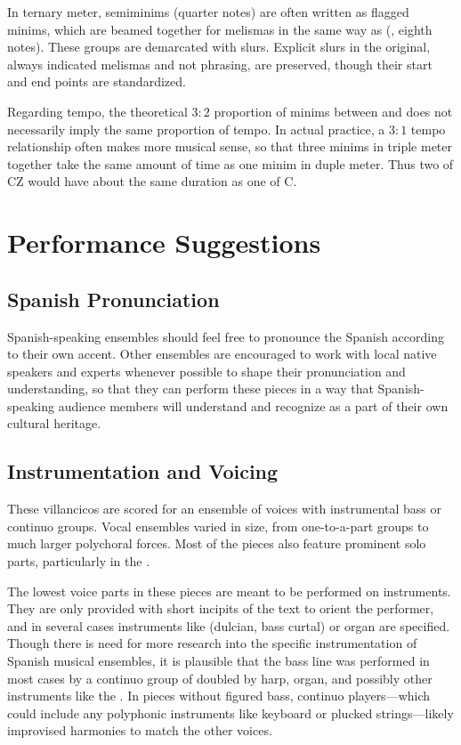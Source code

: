 In ternary meter, semiminims (quarter notes) are often written as flagged
minims, which are beamed together for melismas in the same way as
 (, eighth notes).
These groups are demarcated with slurs.
Explicit slurs in the original, always indicated melismas and not phrasing,
are preserved, though their start and end points are standardized.

Regarding tempo, the theoretical $3:2$ proportion of minims between
\meterCThreeTwo{} and \meterC{} does not necessarily imply the same proportion of
tempo.  
In actual practice, a $3:1$ tempo relationship often makes more musical sense,
so that three minims in triple meter together take the same amount of time as
one minim in duple meter.
Thus two  of CZ would have about the same duration as one 
 of C.

\section{Performance Suggestions}

\subsection{Spanish Pronunciation}
Spanish-speaking ensembles should feel free to pronounce the Spanish according
to their own accent.
Other ensembles are encouraged to work with local native speakers and experts
whenever possible to shape their pronunciation and understanding, so that they
can perform these pieces in a way that Spanish-speaking audience members will
understand and recognize as a part of their own cultural heritage.

\subsection{Instrumentation and Voicing}
These villancicos are scored for an ensemble of voices with instrumental bass 
or continuo groups.
Vocal ensembles varied in size, from one-to-a-part groups to much larger 
polychoral forces.
Most of the pieces also feature prominent solo parts, particularly in the 
.

The lowest voice parts in these pieces are meant to be performed on instruments. 
They are only provided with short incipits of the text to orient the 
performer, and in several cases instruments like  (dulcian, bass
curtal) or organ are specified.
Though there is need for more research into the specific instrumentation of 
Spanish musical ensembles, it is plausible that the bass line was performed in 
most cases by a continuo group of  doubled by harp, organ, and 
possibly other instruments like the .%
    \Autocite
    [On the changing instrumentation in one Spanish institution, see][]
    {Torrente:PhD}
In pieces without figured bass, continuo players---which could include any
polyphonic instruments like keyboard or plucked strings---likely improvised
harmonies to match the other voices.

